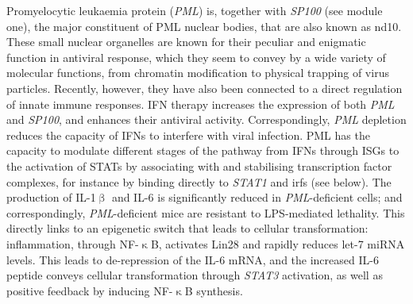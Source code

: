 Promyelocytic leukaemia protein (\emph{PML}) is, together with \emph{SP100} (see module one), the major constituent of PML nuclear bodies, that are also known as \ac{nd10}. These small nuclear organelles are known for their peculiar and enigmatic function in antiviral response, which they seem to convey by a wide variety of molecular functions, from chromatin modification to physical trapping of virus particles.\cite{Lallemand-Breitenbach2018} Recently, however, they have also been connected to a direct regulation of innate immune responses. IFN therapy increases the expression of both \emph{PML} and \emph{SP100}, and enhances their antiviral activity.\cite{Regad2001} Correspondingly, \emph{PML} depletion reduces the capacity of IFNs to interfere with viral infection.\cite{Chee2003} PML has the capacity to modulate different stages of the pathway from IFNs through ISGs to the activation of STATs by associating with and stabilising transcription factor complexes, for instance by binding directly to \emph{STAT1} and \acp{irf} (see below).\cite{Chen2015} The production of IL-1$\upbeta$ and IL-6 is significantly reduced in \emph{PML}-deficient cells;\cite{Lo2013} and correspondingly, \emph{PML}-deficient mice are resistant to LPS-mediated lethality.\cite{Lunardi2011} This directly links to an epigenetic switch that leads to cellular transformation: inflammation, through NF-$\upkappa$B, activates Lin28 and rapidly reduces let-7 miRNA levels. This leads to de-repression of the IL-6 mRNA, and the increased IL-6 peptide conveys cellular transformation through \emph{STAT3} activation, as well as positive feedback by inducing NF-$\upkappa$B synthesis.\cite{Iliopoulos2009}

